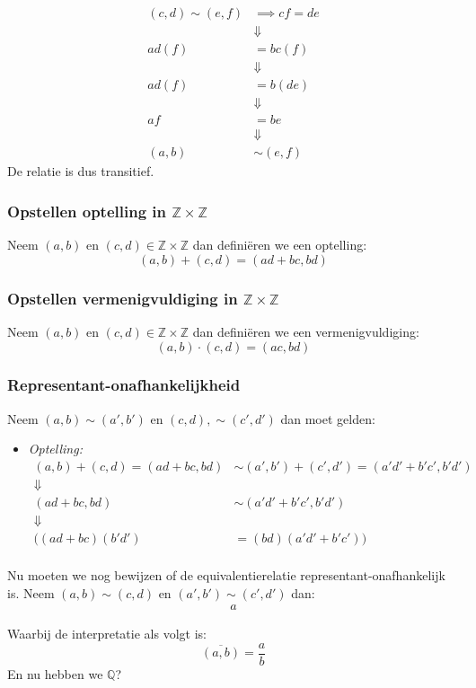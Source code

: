 \documentclass{article}
\newcommand{\Z}{\mathbb{Z}}
\newcommand{\ol}[1]{\overline{#1}}
\newcommand{\en}{\text{ en }}
\begin{document}
\begin{enumerate}[label=\arabic*]
\begin{align*}
              (c, d) \sim (e, f) & \implies cf = de \\
                                 & \Downarrow       \\
              ad(f)              & = bc(f)          \\
                                 & \Downarrow       \\
              ad(f)              & = b(de)          \\
                                 & \Downarrow       \\
              af                 & = be             \\
                                 & \Downarrow       \\
              (a,b)              & \sim (e,f)
          \end{align*}
          De relatie is dus transitief.
\end{enumerate}
\subsubsection*{Opstellen optelling in \(\Z \times \Z \)}
Neem \((a, b) \en (c, d) \in \Z \times \Z \) dan definiëren we een optelling:
\[(a, b) + (c, d) = (ad + bc, bd)\]
\subsubsection*{Opstellen vermenigvuldiging in \( \Z \times \Z \)}
Neem \((a, b) \en (c, d) \in \Z \times \Z  \) dan definiëren we een vermenigvuldiging:
\[(a, b) \cdot (c, d) = (ac, bd)\]
\subsubsection*{Representant-onafhankelijkheid}
Neem \((a, b)\sim (a', b') \en (c, d), \sim (c', d')\) dan moet gelden:
\begin{itemize}
    \item \emph{Optelling: }
          \begin{align*}
              (a, b) + (c, d) = (ad + bc, bd) & \sim (a', b') + (c', d') = (a'd' + b'c', b'd') \\
              \Downarrow                                                                       \\
              (ad+bc,bd )                     & \sim  (a'd'+ b'c', b'd')                       \\
              \Downarrow                                                                       \\
              ((ad+bc)(b'd')                  & = (bd)(a'd'+b'c'))                             \\
          \end{align*}
\end{itemize}



Nu moeten we nog bewijzen of de equivalentierelatie representant-onafhankelijk is. Neem $(a,b) \sim (c,d)$ en $(a',b') \sim (c',d')$ dan:
\begin{align*}
    a
\end{align*}

Waarbij de interpretatie als volgt is:
\[\ol{(a, b)} = \frac{a}{b}\]
En nu hebben we $\mathbb{Q}$?
\end{document}

